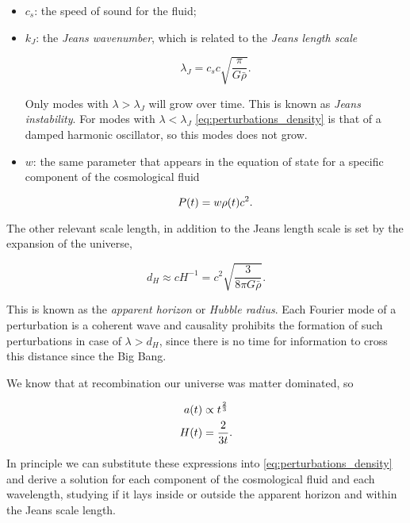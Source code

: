 \begin{itemize}
        \item $c_s$: the speed of sound for the fluid;
        \item $k_J$: the \emph{Jeans wavenumber}, which is related to the
        \emph{Jeans length scale}

        \begin{equation}
                \lambda_J = c_s c \sqrt{\frac{\pi}{G \bar \rho}}.
        \end{equation}

        Only modes with $\lambda > \lambda_J$ will grow over time. This is
        known as \emph{Jeans instability}.
        For modes with $\lambda < \lambda_J$
        \autoref{eq:perturbations_density} is that of a damped harmonic
        oscillator, so this modes does not grow.

        \item $w$: the same parameter that appears in the equation of state
        for a specific component of the cosmological fluid

        \begin{equation}
                P\qty(t) = w \rho\qty(t) c^2.
        \end{equation}
\end{itemize}

The other relevant scale length, in addition to the Jeans length scale is
set by the expansion of the universe,

\begin{equation}
        d_H \approx cH^{-1} = c^2 \sqrt{\frac{3}{8\pi G \bar \rho}}.
\end{equation}

This is known as the \emph{apparent horizon} or \emph{Hubble radius}.
Each Fourier mode of a perturbation
is a coherent wave and causality prohibits the formation of such perturbations
in case of $\lambda > d_H$, since there is no time for information to cross
this distance since the Big Bang.

We know that at recombination our universe was matter dominated, so

\begin{align}
        a\qty(t) & \propto t^\frac{2}{3} \\
        H\qty(t) & = \frac{2}{3t}.
\end{align}

In principle we can substitute these expressions into
\autoref{eq:perturbations_density} and derive a solution for each component
of the cosmological fluid and each wavelength, studying if it lays inside
or outside the apparent horizon and within the Jeans scale length.

